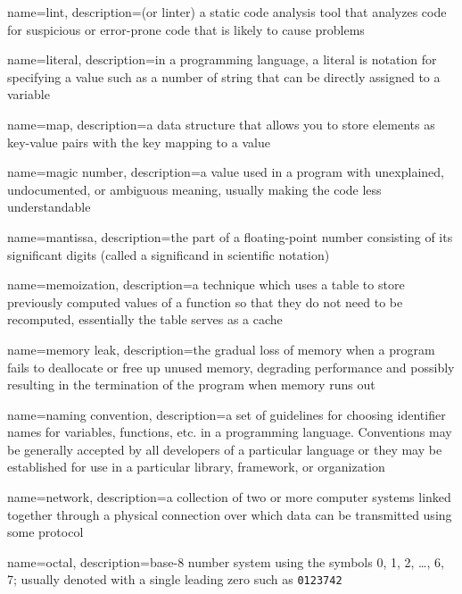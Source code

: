 {
  name=lint,
  description={(or linter) a static code analysis tool that analyzes code for suspicious or error-prone code that is likely to cause problems}
}

{
  name=literal,
  description={in a programming language, a literal is notation for specifying a value such as a number of string that can be 
  	directly assigned to a variable}
}

{
  name=map,
  description={a data structure that allows you to store elements as key-value pairs with the key mapping to a value}
}

{
  name=magic number,
  description={a value used in a program with unexplained, undocumented, or ambiguous meaning, usually making the code less understandable}
}

{
  name=mantissa,
  description={the part of a floating-point number consisting of its significant digits (called a significand in scientific notation)}
}

{
  name=memoization,
  description={a technique which uses a table to store previously computed values of a function so that they do not need to be recomputed, essentially the table serves as a cache}
}

{
  name=memory leak,
  description={the gradual loss of memory when a program fails to deallocate or free up unused memory, degrading performance and possibly resulting in the termination of the program when memory runs out}
}

{
  name=naming convention,
  description={a set of guidelines for choosing identifier names for variables, functions, etc. in a programming language.  Conventions may be generally accepted by all developers of a particular language or they may be established for use in a particular library, framework, or organization}
}

{
  name=network,
  description={a collection of two or more computer systems linked together through a physical connection over which data can be transmitted using some protocol}
}

{
  name=octal,
  description={base-8 number system using the symbols 0, 1, 2, \ldots, 6, 7; usually denoted with a single leading zero such as
\texttt{0123742}}
}

